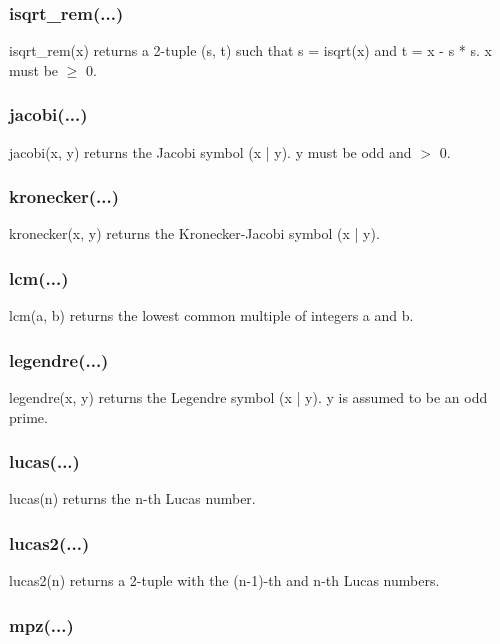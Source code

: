 \subsubsection{isqrt\_rem(...)}

isqrt\_rem(x) returns a 2-tuple (s, t) such that s = isqrt(x) and t = x - s * s. x must be $\ge$ 0.

\subsubsection{jacobi(...)}

jacobi(x, y) returns the Jacobi symbol (x | y). y must be odd and $>$ 0.

\subsubsection{kronecker(...)}

kronecker(x, y) returns the Kronecker-Jacobi symbol (x | y).

\subsubsection{lcm(...)}

lcm(a, b) returns the lowest common multiple of integers a and b.

\subsubsection{legendre(...)}

legendre(x, y) returns the Legendre symbol (x | y). y is assumed to be an odd prime.

\subsubsection{lucas(...)}

lucas(n) returns the n-th Lucas number.

\subsubsection{lucas2(...)}

lucas2(n) returns a 2-tuple with the (n-1)-th and n-th Lucas numbers.

\subsubsection{mpz(...)}


